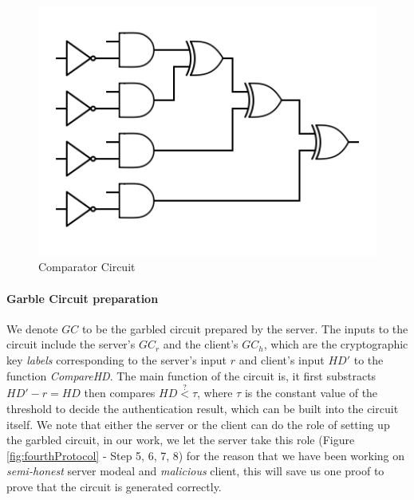 \begin{figure}[htbp!] 
  \centering    
  \includegraphics[width=1.0\textwidth]{Chapter6/Figs/Raster/comparisionCircuit}
  \caption{Comparator Circuit}
  \label{fig:comparisionCircuit}
\end{figure}

\paragraph{Garble Circuit preparation}
We denote \(GC\) to be the garbled circuit prepared by the server. The inputs to
the circuit include the server's \(GC_{r}\) and the client's \(GC_{h}\), which
are the cryptographic key \textit{labels} corresponding to the server's input
\(r\) and client's input \(HD'\) to the function \textit{CompareHD}. The main
function of the circuit is, it first substracts \(HD' - r = HD\) then compares
\(HD \stackrel{?}{<} \tau\), where \(\tau\) is the constant value of the
threshold to decide the authentication result, which can be built into the
circuit itself. We note that either the server or the client can do the role of
setting up the garbled circuit, in our work, we let the server take this role
(Figure \ref{fig:fourthProtocol} - Step 5, 6, 7, 8) for the reason that we have
been working on \textit{semi-honest} server modeal and \textit{malicious }
client, this will save us one proof to prove that the circuit is generated
correctly.

